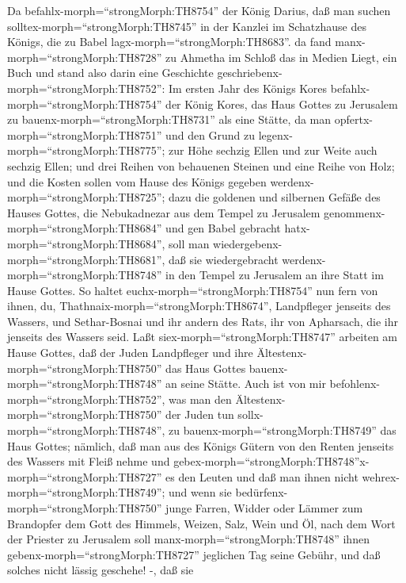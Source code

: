  Da befahlx-morph=``strongMorph:TH8754'' der König Darius,
daß man suchen solltex-morph=``strongMorph:TH8745'' in der Kanzlei im
Schatzhause des Königs, die zu Babel lagx-morph=``strongMorph:TH8683''.
 da fand manx-morph=``strongMorph:TH8728'' zu Ahmetha im
Schloß das in Medien Liegt, ein Buch und stand also darin eine
Geschichte geschriebenx-morph=``strongMorph:TH8752'':  Im
ersten Jahr des Königs Kores befahlx-morph=``strongMorph:TH8754'' der
König Kores, das Haus Gottes zu Jerusalem zu
bauenx-morph=``strongMorph:TH8731'' als eine Stätte, da man
opfertx-morph=``strongMorph:TH8751'' und den Grund zu
legenx-morph=``strongMorph:TH8775''; zur Höhe sechzig Ellen und zur
Weite auch sechzig Ellen;  und drei Reihen von behauenen
Steinen und eine Reihe von Holz; und die Kosten sollen vom Hause des
Königs gegeben werdenx-morph=``strongMorph:TH8725'';  dazu
die goldenen und silbernen Gefäße des Hauses Gottes, die Nebukadnezar
aus dem Tempel zu Jerusalem genommenx-morph=``strongMorph:TH8684'' und
gen Babel gebracht hatx-morph=``strongMorph:TH8684'', soll man
wiedergebenx-morph=``strongMorph:TH8681'', daß sie wiedergebracht
werdenx-morph=``strongMorph:TH8748'' in den Tempel zu Jerusalem an ihre
Statt im Hause Gottes.  So haltet
euchx-morph=``strongMorph:TH8754'' nun fern von ihnen, du,
Thathnai\textbar x-morph=``strongMorph:TH8674'', Landpfleger jenseits
des Wassers, und Sethar-Bosnai und ihr andern des Rats, ihr von
Apharsach, die ihr jenseits des Wassers seid.  Laßt
siex-morph=``strongMorph:TH8747'' arbeiten am Hause Gottes, daß der
Juden Landpfleger und ihre Ältestenx-morph=``strongMorph:TH8750'' das
Haus Gottes bauenx-morph=``strongMorph:TH8748'' an seine Stätte.
 Auch ist von mir befohlenx-morph=``strongMorph:TH8752'',
was man den Ältestenx-morph=``strongMorph:TH8750'' der Juden tun
sollx-morph=``strongMorph:TH8748'', zu
bauenx-morph=``strongMorph:TH8749'' das Haus Gottes; nämlich, daß man
aus des Königs Gütern von den Renten jenseits des Wassers mit Fleiß
nehme und
gebex-morph=``strongMorph:TH8748''x-morph=``strongMorph:TH8727'' es den
Leuten und daß man ihnen nicht wehrex-morph=``strongMorph:TH8749'';
 und wenn sie bedürfenx-morph=``strongMorph:TH8750'' junge
Farren, Widder oder Lämmer zum Brandopfer dem Gott des Himmels, Weizen,
Salz, Wein und Öl, nach dem Wort der Priester zu Jerusalem soll
manx-morph=``strongMorph:TH8748'' ihnen
gebenx-morph=``strongMorph:TH8727'' jeglichen Tag seine Gebühr, und daß
solches nicht lässig geschehe! -,  daß sie
